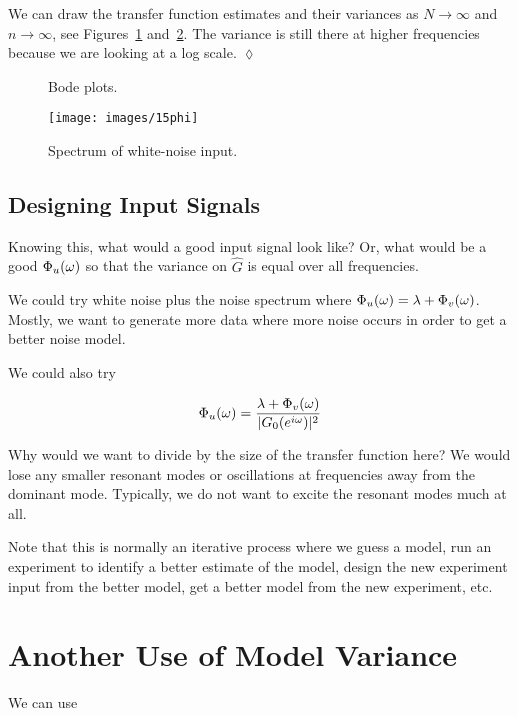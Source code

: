 \begin{example}
We can draw the transfer function estimates and their variances as $N\to\infty$ and $n\to\infty$, see Figures~\ref{fig:15tf} and~\ref{fig:15phi}.
The variance is still there at higher frequencies because we are looking at a log scale.
$\lozenge$
\end{example}

\begin{figure}[ht!]
\centering
{} \hfill
{}
\caption{Bode plots.}%
\label{fig:15tf}
\end{figure}

\begin{figure}[ht!]
\centering
\texttt{[image: images/15phi]}
\caption{Spectrum of white-noise input.}%
\label{fig:15phi}
\end{figure}

\subsection{Designing Input Signals}
Knowing this, what would a good input signal look like?
Or, what would be a good $\Phi_u(\omega)$ so that the variance on $\hat{G}$ is equal over all frequencies.

We could try white noise plus the noise spectrum where $\Phi_u(\omega)=\lambda+\Phi_v(\omega)$.
Mostly, we want to generate more data where more noise occurs in order to get a better noise model.

We could also try

\begin{equation*}
\Phi_u(\omega) = \frac{\lambda+\Phi_v(\omega)}{|G_0(e^{i\omega})|^2}
\end{equation*}

Why would we want to divide by the size of the transfer function here?
We would lose any smaller resonant modes or oscillations at frequencies away from the dominant mode.
Typically, we do not want to excite the resonant modes much at all.

Note that this is normally an iterative process where we guess a model, run an experiment to identify a better estimate of the model, design the new experiment input from the better model, get a better model from the new experiment, etc.

\section{Another Use of Model Variance}
We can use

